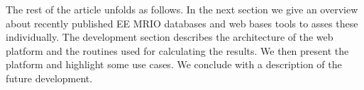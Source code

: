 The rest of the article unfolds as follows. In the next section we give an
overview about recently published EE MRIO databases and web bases tools to
asses these individually. The development section describes the architecture of the
web platform and the routines used for calculating the results. We then present
the platform and highlight some use cases. We conclude with a description of
the future development.